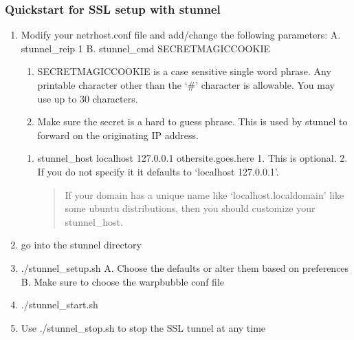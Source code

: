 \documentclass[letterpaper,10pt,english]{sphinxmanual}
\begin{document}
\subsubsection{Quickstart for SSL setup with stunnel}
\label{\detokenize{security:quickstart-for-ssl-setup-with-stunnel}}\begin{enumerate}
%
\item {} 
\sphinxAtStartPar
Modify your netrhost.conf file and add/change the following parameters:
A. stunnel\_reip 1
B. stunnel\_cmd SECRET\sphinxhyphen{}MAGIC\sphinxhyphen{}COOKIE
\begin{enumerate}
%
\item {} 
\sphinxAtStartPar
SECRET\sphinxhyphen{}MAGIC\sphinxhyphen{}COOKIE is a case sensitive single word phrase.  Any
printable character other than the ‘\#’ character is allowable.
You may use up to 30 characters.

\item {} 
\sphinxAtStartPar
Make sure the secret is a hard to guess phrase.  This is used
by stunnel to forward on the originating IP address.

\end{enumerate}
\begin{enumerate}
%
\setcounter{enumii}{2}
\item {} 
\sphinxAtStartPar
stunnel\_host localhost 127.0.0.1 othersite.goes.here
1.  This is optional.
2.  If you do not specify it it defaults to ‘localhost 127.0.0.1’.
\begin{quote}

\sphinxAtStartPar
If your domain has a unique name like ‘localhost.localdomain’
like some ubuntu distributions, then you should customize your
stunnel\_host.
\end{quote}

\end{enumerate}

\item {} 
\sphinxAtStartPar
go into the stunnel directory

\item {} 
\sphinxAtStartPar
./stunnel\_setup.sh
A. Choose the defaults or alter them based on preferences
B. Make sure to choose the warpbubble conf file

\item {} 
\sphinxAtStartPar
./stunnel\_start.sh

\item {} 
\sphinxAtStartPar
Use ./stunnel\_stop.sh to stop the SSL tunnel at any time

\end{enumerate}
\end{document}
